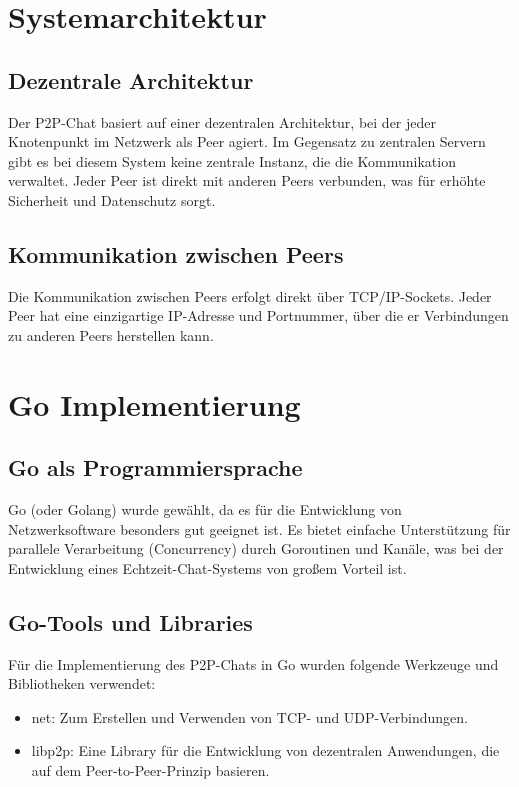 \section{Systemarchitektur}

\subsection{Dezentrale Architektur}
Der P2P-Chat basiert auf einer dezentralen Architektur, bei der jeder Knotenpunkt im Netzwerk als Peer agiert. Im Gegensatz zu zentralen Servern gibt es bei diesem System keine zentrale Instanz, die die Kommunikation verwaltet. Jeder Peer ist direkt mit anderen Peers verbunden, was für erhöhte Sicherheit und Datenschutz sorgt. \cite{peer_to_peer}

\subsection{Kommunikation zwischen Peers}
Die Kommunikation zwischen Peers erfolgt direkt über TCP/IP-Sockets. Jeder Peer hat eine einzigartige IP-Adresse und Portnummer, über die er Verbindungen zu anderen Peers herstellen kann.

\section{Go Implementierung}

\subsection{Go als Programmiersprache}

Go (oder Golang) wurde gewählt, da es für die Entwicklung von Netzwerksoftware besonders gut geeignet ist. Es bietet einfache Unterstützung für parallele Verarbeitung (Concurrency) durch Goroutinen und Kanäle, was bei der Entwicklung eines Echtzeit-Chat-Systems von großem Vorteil ist. \cite{go_docs}

\subsection {Go-Tools und Libraries}

Für die Implementierung des P2P-Chats in Go wurden folgende Werkzeuge und Bibliotheken verwendet:

\begin{itemize}
    \item net: Zum Erstellen und Verwenden von TCP- und UDP-Verbindungen.
    \item libp2p: Eine Library für die Entwicklung von dezentralen Anwendungen, die auf dem Peer-to-Peer-Prinzip basieren. \cite{libp2p_go_getting_started}
\end{itemize}

